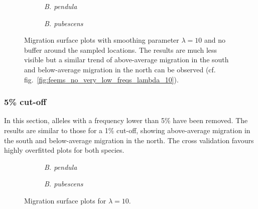 \documentclass[hidelinks,11pt]{article}
\newcommand{\pendula}{\textit{B. pendula}}
\newcommand{\pubescens}{\textit{B. pubescens}}
\begin{document}
    \begin{figure}[H]
        \centering
        \begin{subfigure}[b]{0.47\textwidth}
            \centering
            \caption{\pendula{}}
        \end{subfigure}
        \hfill
        \begin{subfigure}[b]{0.47\textwidth}
            \centering
            \caption{\pubescens{}}
        \end{subfigure}
        \caption{Migration surface plots with smoothing parameter $\lambda = 10$ and no buffer around the sampled locations. The results are much less visible but a similar trend of above-average migration in the south and below-average migration in the north can be observed (cf. fig.~\ref{fig:feems_no_very_low_freqs_lambda_10}).}
        \label{fig:feems_no_buffer_no_low_freqs}
    \end{figure}

    \subsubsection{5\% cut-off}

    In this section, alleles with a frequency lower than 5\% have been removed. The results are similar to those for a 1\% cut-off, showing above-average migration in the south and below-average migration in the north. The cross validation favours highly overfitted plots for both species.

    \begin{figure}[H]
        \centering
        \begin{subfigure}[b]{0.47\textwidth}
            \centering
            \caption{\pendula{}}
        \end{subfigure}
        \hfill
        \begin{subfigure}[b]{0.47\textwidth}
            \centering
            \caption{\pubescens{}}
        \end{subfigure}
        \caption{Migration surface plots for $\lambda = 10$.}
        \label{fig:feems_no_low_freqs_lambda_10}
    \end{figure}
\end{document}
